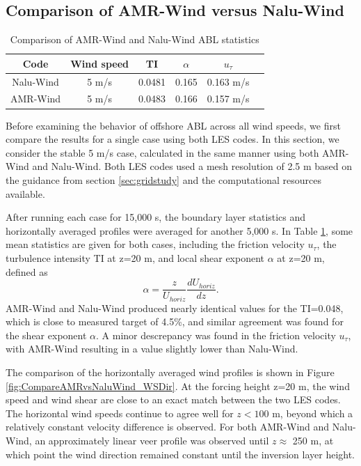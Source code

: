 \subsection{Comparison of AMR-Wind versus Nalu-Wind}

\begin{table}
\caption{\label{tab:CompareAMRvsNalu} Comparison of AMR-Wind and
  Nalu-Wind ABL statistics} \centering
\begin{tabular}{cccccc}
  \hline
  Code & Wind speed & TI      &  $\alpha$  &   $u_\tau$ \\ %
  \hline
  Nalu-Wind & 5 m/s &  0.0481 &  0.165     &  0.163 m/s \\ %
  AMR-Wind  & 5 m/s &  0.0483 &  0.166     &  0.157 m/s \\ %
  \hline
\end{tabular}
\end{table}

Before examining the behavior of offshore ABL across all wind speeds,
we first compare the results for a single case using both LES codes.
In this section, we consider the stable 5 m/s case, calculated in the
same manner using both AMR-Wind and Nalu-Wind.  Both LES codes used a
mesh resolution of 2.5 m based on the guidance from section
\ref{sec:gridstudy} and the computational resources available.

After running each case for 15,000 s, the boundary layer
statistics and horizontally averaged profiles were averaged for
another 5,000 s.  In Table \ref{tab:CompareAMRvsNalu}, some mean
statistics are given for both cases, including the friction velocity
$u_\tau$, the turbulence intensity TI at z=20 m, and local shear
exponent $\alpha$ at z=20 m, defined as
$$ \alpha = \frac{z}{U_{horiz}} \frac{d U_{horiz}}{dz}.
$$ AMR-Wind and Nalu-Wind produced nearly identical values for the
TI=0.048, which is close to measured target of 4.5\%, and similar
agreement was found for the shear exponent $\alpha$.  A minor
descrepancy was found in the friction velocity $u_\tau$, with AMR-Wind
resulting in a value slightly lower than Nalu-Wind.

The comparison of the horizontally averaged wind profiles is shown in
Figure  \ref{fig:CompareAMRvsNaluWind_WSDir}.  At the forcing height
z=20 m, the wind speed and wind shear are close to an exact match
between the two LES codes.  The horizontal wind speeds continue to
agree well for $z < 100$ m, beyond which a relatively constant velocity
difference is observed.   For both AMR-Wind and Nalu-Wind, an
approximately linear veer profile was observed until $z\approx$ 250 m,
at which point the wind direction remained constant until the
inversion layer height.

